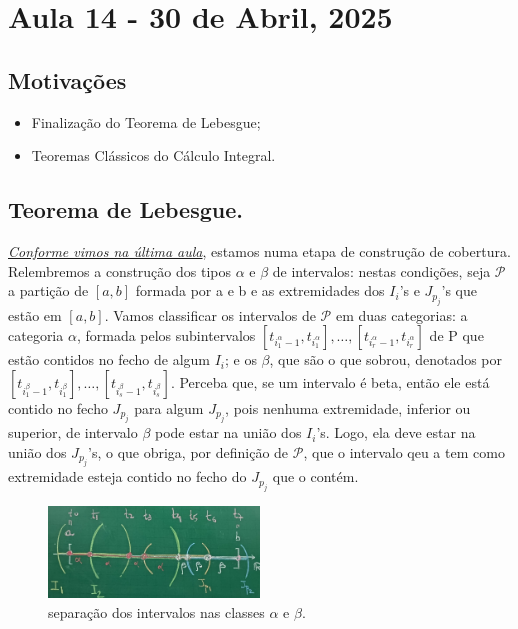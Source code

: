 \documentclass[../analysisII_notes.tex]{subfiles}
\begin{document}
\section{Aula 14 - 30 de Abril, 2025}
\subsection{Motivações}
\begin{itemize}
	\item Finalização do Teorema de Lebesgue;
	\item Teoremas Clássicos do Cálculo Integral.
\end{itemize}
\subsection{Teorema de Lebesgue.}
\begin{proof*}
	\hyperlink{next_class_13}{\textit{Conforme vimos na última aula}}, estamos numa etapa de construção de cobertura. Relembremos a construção dos tipos \(\alpha \) e \(\beta \) de intervalos:	nestas condições, seja \(\mathcal{P}\) a partição de \([a, b]\) formada por a e b e as extremidades dos \(I_{i}\)'s e \(J_{p_{j}}\)'s que estão em \([a, b]\). Vamos classificar os intervalos de \(\mathcal{P}\) em duas categorias: a categoria \(\alpha \), formada pelos subintervalos \([t_{i_{1}^{\alpha }-1}, t_{i_{1}^{\alpha }}], \dotsc , [t_{i_{r}^{\alpha }-1}, t_{i_{r}^{\alpha }}]\) de P que estão contidos no fecho de algum \(I_{i}\); e os \(\beta \), que são o que sobrou, denotados por \([t_{i_{1}^{\beta }-1}, t_{i_{1}^{\beta }}],\dotsc ,[t_{i_{s}^{\beta }-1}, t_{i_{s}^{\beta }}]\).
	Perceba que, se um intervalo é beta, então ele está contido no fecho \(J_{p_{j}}\) para algum \(J_{p_{j}}\), pois nenhuma extremidade, inferior ou superior, de intervalo \(\beta \) pode estar na união dos \(I_{i}\)'s. Logo, ela deve estar na união dos \(J_{p_{j}}\)'s, o que obriga, por definição de \(\mathcal{P}\), que o intervalo qeu a tem como extremidade esteja contido no fecho do \(J_{p_{j}}\) que o contém.

	\begin{figure}[H]
		\begin{center}
			\includegraphics[height=0.5\textheight, width=0.5\textwidth, keepaspectratio]{./Images/classified_intervals_13.png}
		\end{center}
		\caption{separação dos intervalos nas classes \(\alpha \) e \(\beta \).}
		\label{classified14}
	\end{figure}


\end{proof*}
\end{document}
